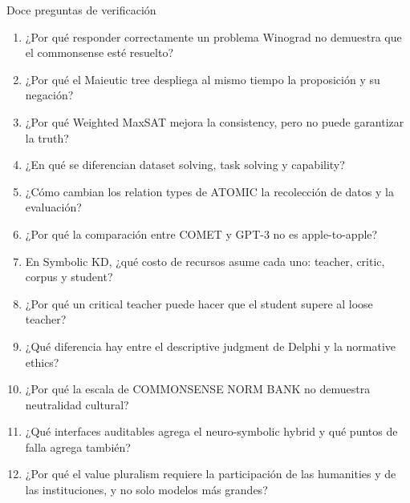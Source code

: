 \documentclass[a4paper]{article}
\begin{document}
\begin{importantbox}{Doce preguntas de verificación}
\begin{enumerate}
  \item ¿Por qué responder correctamente un problema Winograd no demuestra que el commonsense esté resuelto?
  \item ¿Por qué el Maieutic tree despliega al mismo tiempo la proposición y su negación?
  \item ¿Por qué Weighted MaxSAT mejora la consistency, pero no puede garantizar la truth?
  \item ¿En qué se diferencian dataset solving, task solving y capability?
  \item ¿Cómo cambian los relation types de ATOMIC la recolección de datos y la evaluación?
  \item ¿Por qué la comparación entre COMET y GPT-3 no es apple-to-apple?
  \item En Symbolic KD, ¿qué costo de recursos asume cada uno: teacher, critic, corpus y student?
  \item ¿Por qué un critical teacher puede hacer que el student supere al loose teacher?
  \item ¿Qué diferencia hay entre el descriptive judgment de Delphi y la normative ethics?
  \item ¿Por qué la escala de COMMONSENSE NORM BANK no demuestra neutralidad cultural?
  \item ¿Qué interfaces auditables agrega el neuro-symbolic hybrid y qué puntos de falla agrega también?
  \item ¿Por qué el value pluralism requiere la participación de las humanities y de las instituciones, y no solo modelos más grandes?
\end{enumerate}
\end{importantbox}
\end{document}
